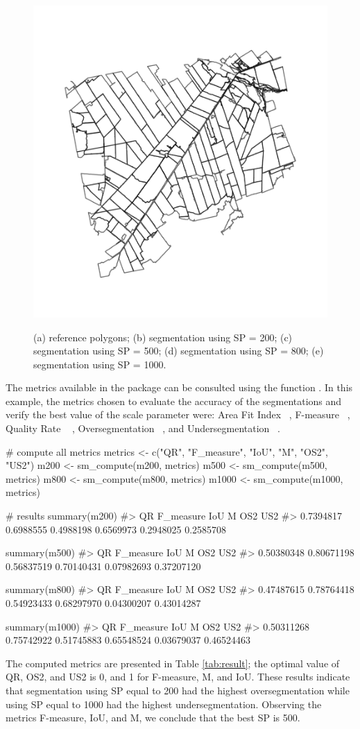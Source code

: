 \begin{figure}[htb]
    {\includegraphics[trim=20 25 20 25, clip, width=.33\textwidth]{fig4e.png}}
    \caption{(a) reference polygons; (b) segmentation using  SP = 200; (c) segmentation using  SP = 500; (d) segmentation using  SP = 800; (e) segmentation using  SP = 1000.}
    \label{fig:plot}
\end{figure}

The metrics available in the package can be consulted using the function . In this example, the metrics chosen to evaluate the accuracy of the segmentations and verify the best value of the scale parameter were: Area Fit Index ~\citep{Carleer2005}, F-measure~ \citep{vanRijsbergen1979} \citep{Zhang2015},  Quality Rate ~\citep{Weidner2008} \citep{Clinton2010}, Oversegmentation ~\citep{Clinton2010}, and Undersegmentation ~\citep{Clinton2010}.

\begin{example}
# compute all metrics
metrics <- c("QR", "F_measure", "IoU", "M", "OS2", "US2")
m200 <- sm_compute(m200, metrics)
m500 <- sm_compute(m500, metrics)
m800 <- sm_compute(m800, metrics)
m1000 <- sm_compute(m1000, metrics)

# results
summary(m200)
#>        QR F_measure       IoU         M       OS2       US2
#> 0.7394817 0.6988555 0.4988198 0.6569973 0.2948025 0.2585708

summary(m500)
#>         QR  F_measure        IoU          M        OS2        US2 
#> 0.50380348 0.80671198 0.56837519 0.70140431 0.07982693 0.37207120 

summary(m800)
#>         QR  F_measure        IoU          M        OS2        US2 
#> 0.47487615 0.78764418 0.54923433 0.68297970 0.04300207 0.43014287 


summary(m1000)
#>         QR  F_measure        IoU          M        OS2        US2 
#> 0.50311268 0.75742922 0.51745883 0.65548524 0.03679037 0.46524463 
\end{example}

The computed metrics are presented in Table \ref{tab:result}; the optimal value of QR, OS2, and US2 is 0, and 1 for F-measure, M, and IoU. These results indicate that segmentation using SP equal to 200 had the highest oversegmentation while using SP equal to 1000 had the highest undersegmentation. Observing the metrics F-measure, IoU, and M, we conclude that the best SP is 500.

